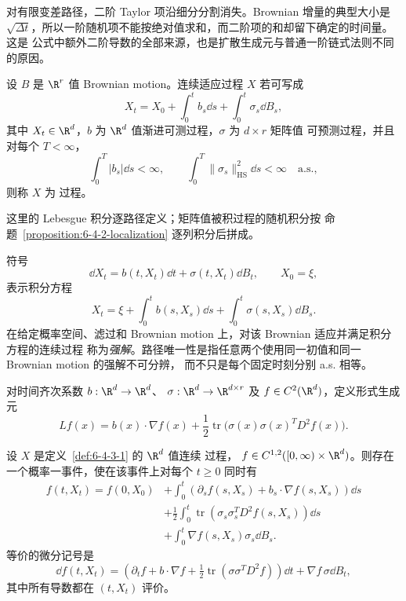 对有限变差路径，二阶 Taylor 项沿细分分割消失。Brownian 增量的典型大小是
$\sqrt{\Delta t}$，所以一阶随机项不能按绝对值求和，而二阶项的和却留下确定的时间量。这是
\Ito{} 公式中额外二阶导数的全部来源，也是扩散生成元与普通一阶链式法则不同的原因。

\begin{definition}[\Ito{} 过程]\label{def:6-4-3-1}
设 $B$ 是 $\R^r$ 值 Brownian motion。连续适应过程 $X$ 若可写成
\[
 X_t=X_0+\int_0^tb_s\dd s+\int_0^t\sigma_s\dd B_s,
\]
其中 $X_t\in\R^d$，$b$ 为 $\R^d$ 值渐进可测过程，$\sigma$ 为 $d\times r$ 矩阵值
可预测过程，并且对每个 $T<\infty$，
\[
 \int_0^T|b_s|\dd s<\infty,
 \qquad
 \int_0^T\|\sigma_s\|_{\mathrm{HS}}^2\dd s<\infty
 \quad\text{a.s.},
\]
则称 $X$ 为 \Ito{} 过程。
\end{definition}

这里的 Lebesgue 积分逐路径定义；矩阵值被积过程的随机积分按
命题~\ref{proposition:6-4-2-localization} 逐列积分后拼成。

\begin{definition}[随机微分方程]\label{def:6-4-3-2}
符号
\[
 \dd X_t=b(t,X_t)\dd t+\sigma(t,X_t)\dd B_t,
 \qquad X_0=\xi,
\]
表示积分方程
\[
 X_t=\xi+\int_0^tb(s,X_s)\dd s
          +\int_0^t\sigma(s,X_s)\dd B_s.
\]
在给定概率空间、滤过和 Brownian motion 上，对该 Brownian 适应并满足积分方程的连续过程
称为\emph{强解}。路径唯一性是指任意两个使用同一初值和同一 Brownian motion 的强解不可分辨，
而不只是每个固定时刻分别 a.s. 相等。
\end{definition}

\begin{definition}[扩散生成元]\label{def:6-4-3-3}
对时间齐次系数 $b:\R^d\to\R^d$、
$\sigma:\R^d\to\R^{d\times r}$ 及 $f\in C^2(\R^d)$，定义形式生成元
\[
 Lf(x)=b(x)\cdot\nabla f(x)
 +\frac12\operatorname{tr}\!\bigl(\sigma(x)\sigma(x)^TD^2f(x)\bigr).
\]
\end{definition}

\begin{theorem}[\Ito{} 公式]\label{theorem:6-4-3-1}
设 $X$ 是定义~\ref{def:6-4-3-1} 的 $\R^d$ 值连续 \Ito{} 过程，
$f\in C^{1,2}([0,\infty)\times\R^d)$。则存在一个概率一事件，使在该事件上对每个 $t\ge0$ 同时有
\begin{align*}
 f(t,X_t)=f(0,X_0)
 &+\int_0^t\left(\partial_sf(s,X_s)+b_s\cdot\nabla f(s,X_s)\right)\dd s\\
 &+\frac12\int_0^t
 \operatorname{tr}\!\left(\sigma_s\sigma_s^TD^2f(s,X_s)\right)\dd s\\
 &+\int_0^t\nabla f(s,X_s)\sigma_s\dd B_s.
\end{align*}
等价的微分记号是
\[
 \dd f(t,X_t)=
 \left(\partial_tf+b\cdot\nabla f+\tfrac12
 \operatorname{tr}(\sigma\sigma^TD^2f)\right)\dd t
 +\nabla f\,\sigma\dd B_t,
\]
其中所有导数都在 $(t,X_t)$ 评价。
\end{theorem}

